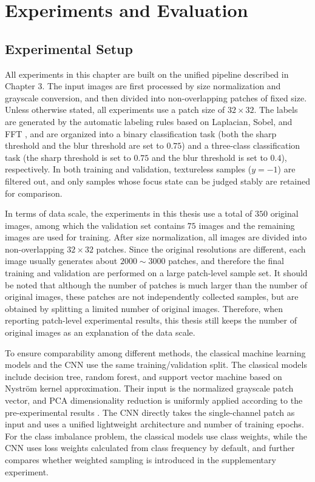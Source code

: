 \chapter{Experiments and Evaluation}
\section{Experimental Setup}
\par All experiments in this chapter are built on the unified pipeline
described in Chapter 3. The input images are first processed by size
normalization and grayscale conversion, and then divided into non-overlapping
patches of fixed size. Unless otherwise stated, all experiments use a patch
size of $32\times32$. The labels are generated by the automatic labeling rules
based on Laplacian, Sobel, and FFT \cite{5739529,1284395}, and are organized
into a binary classification task (both the sharp threshold and the blur
threshold are set to $0.75$) and a three-class classification task (the sharp
threshold is set to $0.75$ and the blur threshold is set to $0.4$),
respectively. In both training and validation, textureless samples ($y=-1$)
are filtered out, and only samples whose focus state can be judged stably are
retained for comparison.

\par In terms of data scale, the experiments in this thesis use a total of
$350$ original images, among which the validation set contains $75$ images and
the remaining images are used for training. After size normalization, all
images are divided into non-overlapping $32\times32$ patches. Since the
original resolutions are different, each image usually generates about
$2000\sim3000$ patches, and therefore the final training and validation are
performed on a large patch-level sample set. It should be noted that although
the number of patches is much larger than the number of original images, these
patches are not independently collected samples, but are obtained by splitting
a limited number of original images. Therefore, when reporting patch-level
experimental results, this thesis still keeps the number of original images as
an explanation of the data scale.

\par To ensure comparability among different methods, the classical machine
learning models and the CNN use the same training/validation split. The
classical models include decision tree, random forest, and support vector
machine based on Nystr\"{o}m kernel approximation. Their input is the
normalized grayscale patch vector, and PCA dimensionality reduction is
uniformly applied according to the pre-experimental results
\cite{perry2025inference,zheng2021application}. The CNN directly takes the
single-channel patch as input and uses a unified lightweight architecture and
number of training epochs. For the class imbalance problem, the classical
models use class weights, while the CNN uses loss weights calculated from
class frequency by default, and further compares whether weighted sampling is
introduced in the supplementary experiment.

